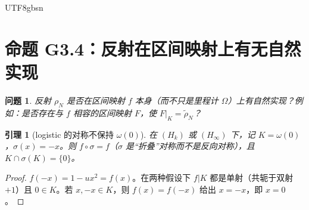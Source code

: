\documentclass[11pt,a4paper]{article}
\newcommand{\status}[1]{\par\noindent\fbox{\textbf{状态：#1}}\par\smallskip}
\newcommand{\Om}{\Omega}               %
\theoremstyle{plain}
\newtheorem{lem}{引理}[section]
\newtheorem{quest}{问题}
\theoremstyle{definition}
\begin{document}
\begin{CJK}{UTF8}{gbsn}
\section{命题 G3.4：反射在区间映射上有无自然实现}\label{g3:sec:interval}

\begin{quest}\label{g3:quest:interval}
反射 $\rho_N$ 是否在区间映射 $f$ 本身（而不只是里程计 $\Om$）上有自然实现？例如：是否存在与 $f$ 相容的区间映射 $F$，使 $F|_K=\tilde\rho_N$？
\end{quest}

\begin{lem}[logistic 的对称不保持 $\omega(0)$]\label{g3:lem:sym}
在 $(H_k)$ 或 $(H_\infty)$ 下，记 $K=\omega(0)$，$\sigma(x)=-x$。则 $f\circ\sigma=f$（$\sigma$ 是“折叠”对称而不是反向对称），且 $K\cap\sigma(K)=\{0\}$。
\end{lem}
\status{已证}
\begin{proof}
$f(-x)=1-ux^2=f(x)$。在两种假设下 $f|K$ 都是单射（共轭于双射 $+1$）且 $0\in K$。若 $x,-x\in K$，则 $f(x)=f(-x)$ 给出 $x=-x$，即 $x=0$。
\end{proof}


\end{CJK}
\end{document}
